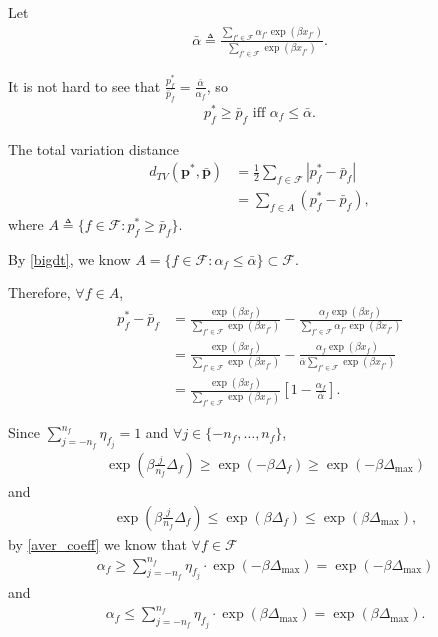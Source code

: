 \documentclass[10pt,conference]{IEEEtran}
\begin{document}
Let
\begin{align}
\label{aver_coeff2} \bar{\alpha}\triangleq \frac{\sum\limits_{f' \in
\mathcal{F}} \alpha_{f'}\exp(\beta x_{f'})}{\sum\limits_{f' \in
\mathcal{F}} \exp(\beta x_{f'})}.
\end{align}

It is not hard to see that $\frac{p^*_f}{\bar{p}_f}=
\frac{\bar{\alpha}}{\alpha_f}$, so
\begin{align}\label{bigdt}
p^*_f \ge \bar{p}_f \text{  iff  } \alpha_f \le \bar{\alpha}.
\end{align}

The total variation distance
\begin{align}
d_{TV}(\boldsymbol{p^*},
\boldsymbol{\bar{p}})&=\frac{1}{2}\sum\limits_{f \in
\mathcal{F}}|p^*_f -\bar{p}_f|\\ &= \sum\limits_{f \in A} (p^*_f
-\bar{p}_f),
\end{align}
where $A\triangleq \{f \in \mathcal{F}: p^*_f \ge \bar{p}_f \}$.

By \eqref{bigdt}, we know $A=\{f \in \mathcal{F}: \alpha_f \le
\bar{\alpha} \} \subset \mathcal{F}$.

Therefore, $\forall f \in A$,
\begin{align}
p^*_f - \bar{p}_f & = \frac{\exp(\beta x_{f})}{\sum\limits_{f' \in
\mathcal{F}} \exp(\beta x_{f'})} - \frac{\alpha_{f}\exp(\beta
x_{f})}{\sum\limits_{f' \in \mathcal{F}} \alpha_{f'}\exp(\beta
x_{f'})} \\ & = \frac{\exp(\beta x_{f})}{\sum\limits_{f' \in
\mathcal{F}} \exp(\beta x_{f'})} - \frac{\alpha_{f}\exp(\beta
x_{f})}{\bar{\alpha}\sum\limits_{f' \in \mathcal{F}} \exp(\beta
x_{f'})} \\ & = \frac{\exp(\beta x_{f})}{\sum\limits_{f' \in
\mathcal{F}} \exp(\beta x_{f'})} [1-\frac{\alpha_{f}}{\bar{\alpha}}].
\label{difference}
\end{align}

Since $\sum\limits_{j = - n_{f} }^{n_{f}} \eta_{f_j}=1$ and $\forall
j \in \{-n_{f},\ldots,n_{f}\}$,
\begin{align}
& \exp(\beta\frac{j}{n_{f}}\Delta_{f}) \ge \exp(-\beta\Delta_{f})
\ge \exp(-\beta\Delta_{\max})
\end{align}
and
\begin{align}
& \exp(\beta\frac{j}{n_{f}}\Delta_{f}) \le \exp(\beta\Delta_{f}) \le
\exp(\beta\Delta_{\max}),
\end{align}
by \eqref{aver_coeff} we know that $\forall f \in \mathcal{F}$
\begin{align}
& \alpha_f \ge \sum\limits_{j = - n_{f} }^{n_{f}} \eta_{f_j} \cdot
\exp(-\beta\Delta_{\max}) = \exp(-\beta\Delta_{\max})
\end{align}
and
\begin{align}
& \alpha_f \le \sum\limits_{j = - n_{f} }^{n_{f}} \eta_{f_j} \cdot
\exp(\beta\Delta_{\max}) = \exp(\beta\Delta_{\max}).
\end{align}
\end{document}
